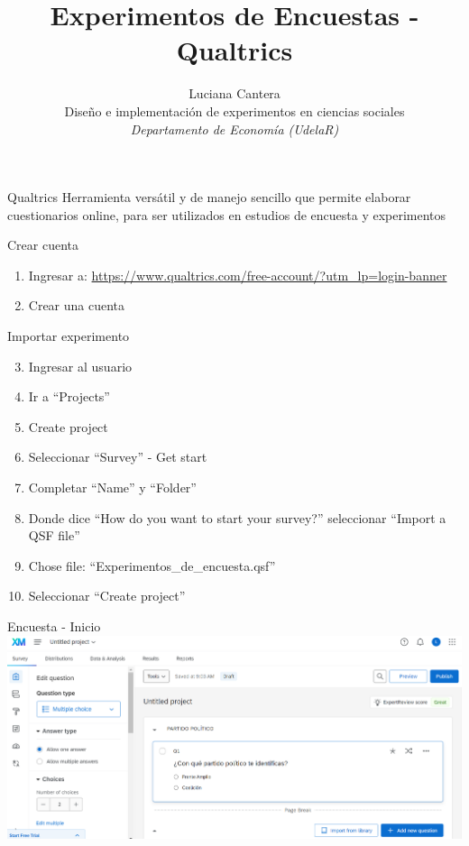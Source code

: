 \documentclass[
  ignorenonframetext,
]{beamer}
\title{Experimentos de Encuestas - Qualtrics}
\author{Luciana Cantera\\
Diseño e implementación de experimentos en ciencias sociales\\
\emph{Departamento de Economía (UdelaR)}}
\date{}
\begin{document}
\frame{\titlepage}

\begin{frame}{Qualtrics}
\protect\hypertarget{qualtrics}{}
Herramienta versátil y de manejo sencillo que permite elaborar
cuestionarios online, para ser utilizados en estudios de encuesta y
experimentos
\end{frame}

\begin{frame}{Crear cuenta}
\protect\hypertarget{crear-cuenta}{}
\begin{enumerate}
\item
  Ingresar a:
  \url{https://www.qualtrics.com/free-account/?utm_lp=login-banner}
\item
  Crear una cuenta
\end{enumerate}
\end{frame}

\begin{frame}{Importar experimento}
\protect\hypertarget{importar-experimento}{}
\begin{enumerate}
\setcounter{enumi}{2}
\item
  Ingresar al usuario
\item
  Ir a ``Projects''
\item
  Create project
\item
  Seleccionar ``Survey'' - Get start
\item
  Completar ``Name'' y ``Folder''
\item
  Donde dice ``How do you want to start your survey?'' seleccionar
  ``Import a QSF file''
\item
  Chose file: ``Experimentos\_de\_encuesta.qsf''
\item
  Seleccionar ``Create project''
\end{enumerate}
\end{frame}

\begin{frame}{Encuesta - Inicio}
\protect\hypertarget{encuesta---inicio}{}
\includegraphics{figs/Qualtrics_survey.png}
\end{frame}
\end{document}
